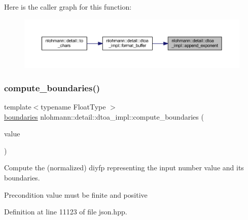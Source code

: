 Here is the caller graph for this function\+:
\nopagebreak
\begin{figure}[H]
\begin{center}
\leavevmode
\includegraphics[width=350pt]{namespacenlohmann_1_1detail_1_1dtoa__impl_a84733638b826eda624488f5fa4521e0b_icgraph}
\end{center}
\end{figure}
\mbox{\label{namespacenlohmann_1_1detail_1_1dtoa__impl_a22b6e37654ac93c6d0d9c06ec1bf5ded}} 
\subsubsection{\texorpdfstring{compute\_boundaries()}{compute\_boundaries()}}
{\footnotesize\ttfamily template$<$typename Float\+Type $>$ \\
\mbox{\hyperlink{structnlohmann_1_1detail_1_1dtoa__impl_1_1boundaries}{boundaries}} nlohmann\+::detail\+::dtoa\+\_\+impl\+::compute\+\_\+boundaries (\begin{DoxyParamCaption}\item[{Float\+Type}]{value }\end{DoxyParamCaption})}

Compute the (normalized) diyfp representing the input number \textquotesingle{}value\textquotesingle{} and its boundaries.

\begin{DoxyPrecond}{Precondition}
value must be finite and positive 
\end{DoxyPrecond}


Definition at line 11123 of file json.\+hpp.

